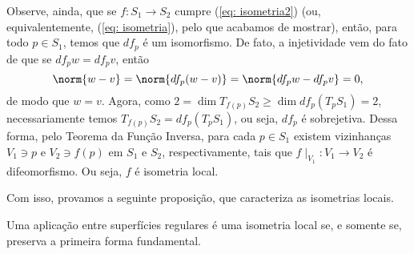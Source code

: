 Observe, ainda, que se \( f : S_{ 1 } \to S_{ 2 } \) cumpre (\ref{eq: isometria2}) (ou, equivalentemente, (\ref{eq: isometria}), pelo que acabamos de mostrar), então, para todo \( p \in S_{ 1 } \), temos que \( df_{ p } \) é um isomorfismo.
De fato, a injetividade vem do fato de que se \( df_{ p }w = df_{ p }v \), então
\begin{equation*}
    \norm{ w - v } = \norm{ df_{ p } ( w - v ) } = \norm{ df_{ p }w - df_{ p }v } = 0
,\end{equation*}
de modo que \( w = v \).
Agora, como \( 2 = \dim T_{ f ( p ) } S_{ 2 } \geq \dim df_{ p } ( T_{ p } S_{ 1 } ) = 2 \), necessariamente temos \( T_{ f ( p ) } S_{ 2 } = df_{ p } ( T_{ p } S_{ 1 } ) \), ou seja, \( df_{ p } \) é sobrejetiva.
Dessa forma, pelo Teorema da Função Inversa, para cada \( p \in S_{ 1 } \) existem vizinhanças \( V_{ 1 } \ni p \) e \( V_{ 2 } \ni f ( p ) \) em \( S_{ 1 } \) e \( S_{ 2 } \), respectivamente, tais que \( f\mid_{ V_{ 1 } } : V_{ 1 } \to V_{ 2 } \) é difeomorfismo.
Ou seja, \( f \) é isometria local.

Com isso, provamos a seguinte proposição, que caracteriza as isometrias locais.
\begin{prop}
    Uma aplicação entre superfícies regulares é uma isometria local se, e somente se, preserva a primeira forma fundamental.
\end{prop}
